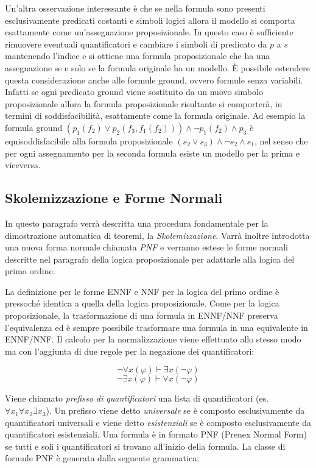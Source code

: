 \documentclass[./main.tex]{subfiles}
\begin{document}
Un'altra osservazione interessante è che se nella formula sono presenti esclusivamente predicati costanti e simboli logici allora il modello si comporta 
esattamente come un'assegnazione proposizionale. 
In questo caso è sufficiente rimuovere eventuali quantificatori e cambiare i simboli di predicato da $p$ a $s$ mantenendo l'indice e si ottiene una 
formula proposizionale che ha una assegnazione se e solo se la formula originale ha un modello.
È possibile estendere questa considerazione anche alle formule ground, ovvero formule senza variabili.
Infatti se ogni predicato ground viene sostituito da un nuovo simbolo proposizionale allora la formula proposizionale risultante si comporterà, in termini di soddisfacibilità,
esattamente come la formula originale. Ad esempio la formula ground $(p_1(f_2) \lor p_2(f_3, f_1(f_2))) \land \lnot p_1(f_2) \land p_3$ 
è equisoddisfacibile alla formula proposizionale $(s_2 \lor s_3) \land \lnot s_2 \land s_1$, nel senso che per ogni assegnamento per la seconda formula
esiste un modello per la prima e viceversa.


\subsection{Skolemizzazione e Forme Normali} \label{sec:forme_normali_fof}
In questo paragrafo verrà descritta una procedura fondamentale per la dimostrazione automatica di teoremi, la \textit{Skolemizzazione}. Varrà inoltre introdotta
una nuova forma normale chiamata \textit{PNF} e verranno
estese le forme normali descritte nel paragrafo della logica proposizionale per adattarle alla logica del primo ordine.


La definizione per le forme ENNF e NNF per la logica del primo ordine è pressoché identica a quella della logica proposizionale.
Come per la logica proposizionale, la trasformazione di una formula in ENNF/NNF preserva l'equivalenza ed è sempre
possibile trasformare una formula in una equivalente in ENNF/NNF. 
Il calcolo per la normalizzazione viene effettuato allo stesso modo ma con l'aggiunta di due regole per la negazione dei quantificatori:

$$ \lnot \forall x (\varphi) \vdash \exists x (\lnot \varphi) $$
$$ \lnot \exists x (\varphi) \vdash \forall x (\lnot \varphi) $$


Viene chiamato \textit{prefisso di quantificatori} una lista di quantificatori (es. $\forall x_1 \forall x_2 \exists x_3$). 
Un prefisso viene detto \textit{universale} se è composto esclusivamente da quantificatori universali e viene detto \textit{esistenziali} 
se è composto esclusivamente da quantificatori esistenziali. Una formula è in formato PNF (Prenex Normal Form) se tutti e soli 
i quantificatori si trovano all'inizio della formula. La classe di formule PNF è generata dalla seguente grammatica:
\end{document}
